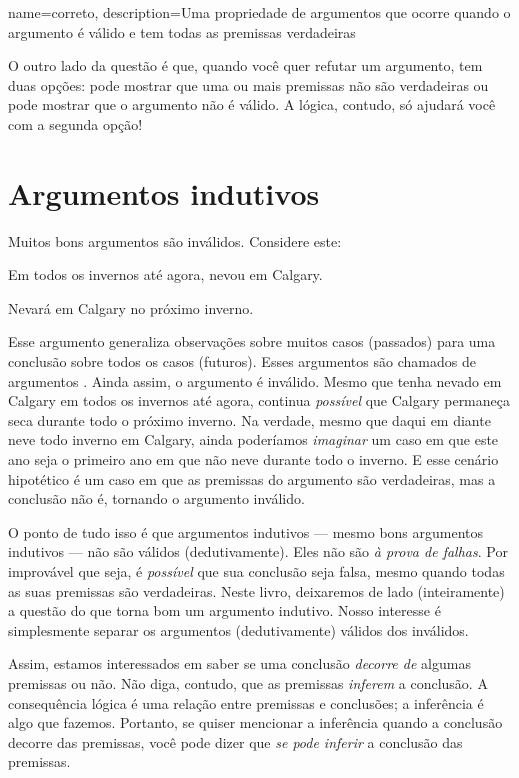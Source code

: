{
name=correto,
description={Uma propriedade de argumentos que ocorre quando o argumento é válido e tem todas as premissas verdadeiras}
}

O outro lado da questão é que, quando você quer refutar um argumento, tem duas opções: pode mostrar que uma ou mais premissas não são verdadeiras ou pode mostrar que o argumento não é válido. A lógica, contudo, só ajudará você com a segunda opção!

\section{Argumentos indutivos}

Muitos bons argumentos são inválidos. Considere este:
	\begin{earg}
		\item[] Em todos os invernos até agora, nevou em Calgary.
	\item[\texttherefore] Nevará em Calgary no próximo inverno.
\end{earg}
Esse argumento generaliza observações sobre muitos casos (passados) para uma conclusão sobre todos os casos (futuros). Esses argumentos são chamados de argumentos . Ainda assim, o argumento é inválido. Mesmo que tenha nevado em Calgary em todos os invernos até agora, continua \emph{possível} que Calgary permaneça seca durante todo o próximo inverno. Na verdade, mesmo que daqui em diante neve todo inverno em Calgary, ainda poderíamos \emph{imaginar} um caso em que este ano seja o primeiro ano em que não neve durante todo o inverno. E esse cenário hipotético é um caso em que as premissas do argumento são verdadeiras, mas a conclusão não é, tornando o argumento inválido.

O ponto de tudo isso é que argumentos indutivos — mesmo bons argumentos indutivos — não são válidos (dedutivamente). Eles não são \emph{à prova de falhas}. Por improvável que seja, é \emph{possível} que sua conclusão seja falsa, mesmo quando todas as suas premissas são verdadeiras. Neste livro, deixaremos de lado (inteiramente) a questão do que torna bom um argumento indutivo. Nosso interesse é simplesmente separar os argumentos (dedutivamente) válidos dos inválidos.

Assim, estamos interessados em saber se uma conclusão \emph{decorre de} algumas premissas ou não. Não diga, contudo, que as premissas \emph{inferem} a conclusão. A consequência lógica é uma relação entre premissas e conclusões; a inferência é algo que fazemos. Portanto, se quiser mencionar a inferência quando a conclusão decorre das premissas, você pode dizer que \emph{se pode inferir} a conclusão das premissas.


